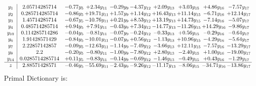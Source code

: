\documentclass[9pt]{article}
\begin{document}
\[\begin{array}{c| c c@{\hskip 2pt} c@{\hskip 2pt} c@{\hskip 2pt} c@{\hskip 2pt} c@{\hskip 2pt} c@{\hskip 2pt} c@{\hskip 2pt} c@{\hskip 2pt} }
 y_{1}   &  2.05714285714 & -0.77 y_{5} & +  2.34 y_{11} & -0.29 y_{9} & -4.37 y_{12} & +  2.09 y_{13} & +  3.03 y_{15} & +  4.86 y_{16} & -7.57 y_{17}\\
 y_{2}   &  0.285714285714 & -0.86 y_{5} & + 19.71 y_{11} & +  1.57 y_{9} & +  1.14 y_{12} & + 16.43 y_{13} & + 11.14 y_{15} & -6.71 y_{16} & + 12.14 y_{17}\\
 y_{3}   &  1.45714285714 & -0.67 y_{5} & -10.76 y_{11} & +  0.21 y_{9} & +  8.53 y_{12} & + 13.19 y_{13} & + 14.73 y_{15} & -7.14 y_{16} & -5.07 y_{17}\\
 y_{4}   &  0.485714285714 & +  0.94 y_{5} & +  7.91 y_{11} & -0.43 y_{9} & +  7.34 y_{12} & -14.77 y_{13} & -11.26 y_{15} & + 14.29 y_{16} & -9.86 y_{17}\\
 y_{10}   &  0.114285714286 & -0.04 y_{5} & -0.81 y_{11} & -0.07 y_{9} & -0.24 y_{12} & -0.33 y_{13} & +  0.56 y_{15} & -0.29 y_{16} & -0.64 y_{17}\\
 y_{6}   &  1.91428571429 & -0.84 y_{5} & -10.01 y_{11} & -0.07 y_{9} & +  0.56 y_{12} & -1.13 y_{13} & + 10.96 y_{15} & -4.29 y_{16} & -5.64 y_{17}\\
 y_{7}   &  2.22857142857 & -0.09 y_{5} & -12.63 y_{11} & -1.14 y_{9} & -7.49 y_{12} & -3.66 y_{13} & + 12.11 y_{15} & -7.57 y_{16} & -13.29 y_{17}\\
 y_{8}   &  2.2 & -0.20 y_{5} & -0.80 y_{11} & -1.00 y_{9} & -7.80 y_{12} & +  2.80 y_{13} & -2.40 y_{15} & +  1.00 y_{16} & -19.00 y_{17}\\
 y_{14}   &  0.0285714285714 & +  0.11 y_{5} & -0.83 y_{11} & -0.14 y_{9} & -0.69 y_{12} & -1.46 y_{13} & -0.49 y_{15} & +  0.43 y_{16} & -1.29 y_{17}\\
\hline
z    &  2.88571428571 & -0.46 y_{5} & -55.69 y_{11} & -2.43 y_{9} & -9.26 y_{12} & -11.17 y_{13} & -8.06 y_{15} & -34.71 y_{16} & -13.86 y_{17}\\
\end{array}\]
Primal Dictionary is:
\end{document}
